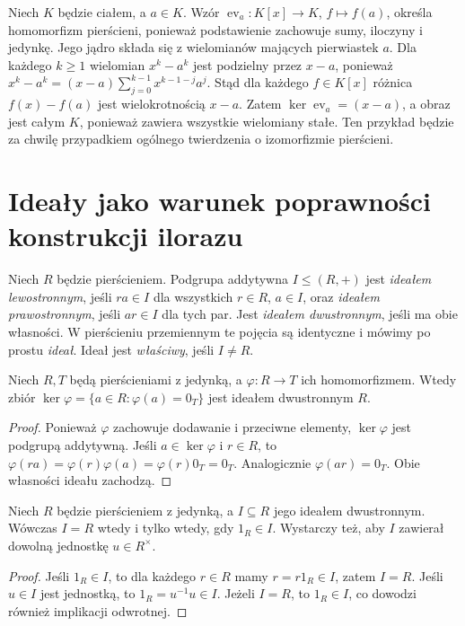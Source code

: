 \begin{przyklad}
\label{aa:prz:poly-eval}
Niech $K$ będzie ciałem, a $a\in K$. Wzór
$\operatorname{ev}_a:K[x]\to K$, $f\mapsto f(a)$,
określa homomorfizm pierścieni, ponieważ podstawienie
zachowuje sumy, iloczyny i jedynkę. Jego jądro składa się
z wielomianów mających pierwiastek $a$. Dla każdego $k\ge1$ wielomian $x^k-a^k$ jest podzielny
przez $x-a$, ponieważ
$x^k-a^k=(x-a)\sum_{j=0}^{k-1}x^{k-1-j}a^j$.
Stąd dla każdego $f\in K[x]$ różnica $f(x)-f(a)$ jest
wielokrotnością $x-a$. Zatem
$\ker\operatorname{ev}_a=(x-a)$, a obraz jest całym $K$,
ponieważ zawiera wszystkie wielomiany stałe.
Ten przykład będzie za chwilę przypadkiem ogólnego twierdzenia
o izomorfizmie pierścieni.
\end{przyklad}

\section{Ideały jako warunek poprawności konstrukcji ilorazu}
\begin{definicja}
\label{aa:def:ideal}
Niech $R$ będzie pierścieniem. Podgrupa addytywna
$I\le(R,+)$ jest \emph{ideałem lewostronnym}, jeśli
$ra\in I$ dla wszystkich $r\in R$, $a\in I$, oraz
\emph{ideałem prawostronnym}, jeśli $ar\in I$ dla tych par.
Jest \emph{ideałem dwustronnym}, jeśli ma obie własności.
W pierścieniu przemiennym te pojęcia są identyczne i mówimy
po prostu \emph{ideał}. Ideał jest \emph{właściwy}, jeśli $I\ne R$.
\end{definicja}
\begin{lemat}
\label{aa:lem:kernel-ideal}
Niech $R,T$ będą pierścieniami z jedynką, a $\varphi:R\to T$
ich homomorfizmem. Wtedy zbiór
$\ker\varphi=\{a\in R:\varphi(a)=0_T\}$
jest ideałem dwustronnym $R$.
\end{lemat}
\begin{proof}
Ponieważ $\varphi$ zachowuje dodawanie i przeciwne elementy,
$\ker\varphi$ jest podgrupą addytywną. Jeśli
$a\in\ker\varphi$ i $r\in R$, to
$\varphi(ra)=\varphi(r)\varphi(a)=\varphi(r)0_T=0_T$.
Analogicznie $\varphi(ar)=0_T$. Obie własności ideału zachodzą.
\end{proof}

\begin{lemat}
\label{aa:lem:ideal-unit}
Niech $R$ będzie pierścieniem z jedynką, a $I\subseteq R$
jego ideałem dwustronnym. Wówczas $I=R$
wtedy i tylko wtedy, gdy $1_R\in I$. Wystarczy też,
aby $I$ zawierał dowolną jednostkę $u\in R^\times$.
\end{lemat}
\begin{proof}
Jeśli $1_R\in I$, to dla każdego $r\in R$ mamy
$r=r1_R\in I$, zatem $I=R$. Jeśli $u\in I$ jest jednostką,
to $1_R=u^{-1}u\in I$. Jeżeli $I=R$, to $1_R\in I$, co dowodzi również implikacji odwrotnej.
\end{proof}

